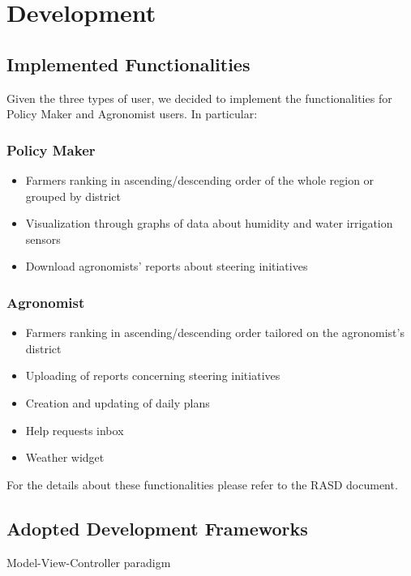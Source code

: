 \documentclass[table, 12pt]{article}
\begin{document}
\newpage
\section{Development}
\subsection{Implemented Functionalities}
Given the three types of user, we decided to implement the functionalities for Policy Maker and Agronomist users. In particular:
\subsubsection*{Policy Maker}
\begin{itemize}
    \item Farmers ranking in ascending/descending order of the whole region or grouped by district
    \item Visualization through graphs of data about humidity and water irrigation sensors
    \item Download agronomists' reports about steering initiatives
\end{itemize}
\subsubsection*{Agronomist}
\begin{itemize}
    \item Farmers ranking in ascending/descending order tailored on the agronomist's district
    \item Uploading of reports concerning steering initiatives
    \item Creation and updating of daily plans
    \item Help requests inbox
    \item Weather widget
\end{itemize}
For the details about these functionalities please refer to the RASD document.
\newpage
\subsection{Adopted Development Frameworks}
Model-View-Controller paradigm
\end{document}
